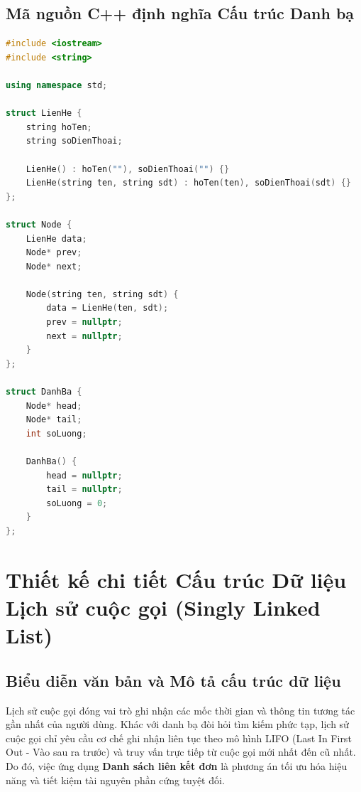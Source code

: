 \subsection{Mã nguồn C++ định nghĩa Cấu trúc Danh bạ}

\begin{lstlisting}[language=C++, caption={Định nghĩa chi tiết Cấu trúc LienHe, Node và DanhBa bằng C++}]
#include <iostream>
#include <string>

using namespace std;

struct LienHe {
    string hoTen;
    string soDienThoai;
    
    LienHe() : hoTen(""), soDienThoai("") {}
    LienHe(string ten, string sdt) : hoTen(ten), soDienThoai(sdt) {}
};

struct Node {
    LienHe data;
    Node* prev;
    Node* next;

    Node(string ten, string sdt) {
        data = LienHe(ten, sdt);
        prev = nullptr;
        next = nullptr;
    }
};

struct DanhBa {
    Node* head;
    Node* tail;
    int soLuong;

    DanhBa() {
        head = nullptr;
        tail = nullptr;
        soLuong = 0;
    }
};
\end{lstlisting}

\section{Thiết kế chi tiết Cấu trúc Dữ liệu Lịch sử cuộc gọi (Singly Linked List)}

\subsection{Biểu diễn văn bản và Mô tả cấu trúc dữ liệu}
Lịch sử cuộc gọi đóng vai trò ghi nhận các mốc thời gian và thông tin tương tác gần nhất của người dùng. Khác với danh bạ đòi hỏi tìm kiếm phức tạp, lịch sử cuộc gọi chỉ yêu cầu cơ chế ghi nhận liên tục theo mô hình LIFO (Last In First Out - Vào sau ra trước) và truy vấn trực tiếp từ cuộc gọi mới nhất đến cũ nhất. Do đó, việc ứng dụng \textbf{Danh sách liên kết đơn} là phương án tối ưu hóa hiệu năng và tiết kiệm tài nguyên phần cứng tuyệt đối.

